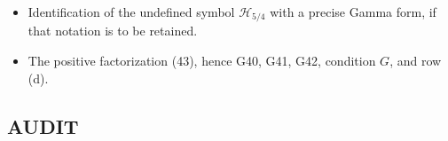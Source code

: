 \documentclass[11pt]{article}
\begin{document}
\begin{itemize}
      source angular operator.
      In the finite-head realization it is enough, by (251)--(253), to exclude
      a nonzero first-loss zero mode and prove the corresponding equality case
      of the ODE/Julia storage network is trivial.  Equivalently, prove the
      exterior-leakage uniqueness statement (257) for clamped potentials.
\item Identification of the undefined symbol $\mathcal H_{5/4}$ with a
      precise Gamma form, if that notation is to be retained.
\item The positive factorization (43), hence G40, G41, G42, condition $G$, and
      row (d).
\end{itemize}

\subsection*{AUDIT}
\end{document}
